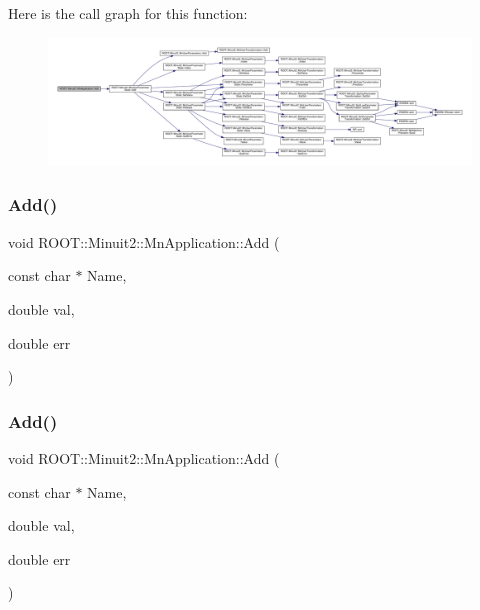 Here is the call graph for this function\+:
\nopagebreak
\begin{figure}[H]
\begin{center}
\leavevmode
\includegraphics[width=350pt]{df/dd5/classROOT_1_1Minuit2_1_1MnApplication_a2912c94b7cb69b29862e1e41ffbc4542_cgraph}
\end{center}
\end{figure}
\mbox{\label{classROOT_1_1Minuit2_1_1MnApplication_a2912c94b7cb69b29862e1e41ffbc4542}} 
\subsubsection{\texorpdfstring{Add()}{Add()}\hspace{0.1cm}{\footnotesize\ttfamily [2/9]}}
{\footnotesize\ttfamily void R\+O\+O\+T\+::\+Minuit2\+::\+Mn\+Application\+::\+Add (\begin{DoxyParamCaption}\item[{const char $\ast$}]{Name,  }\item[{double}]{val,  }\item[{double}]{err }\end{DoxyParamCaption})}

\mbox{\label{classROOT_1_1Minuit2_1_1MnApplication_a2912c94b7cb69b29862e1e41ffbc4542}} 
\subsubsection{\texorpdfstring{Add()}{Add()}\hspace{0.1cm}{\footnotesize\ttfamily [3/9]}}
{\footnotesize\ttfamily void R\+O\+O\+T\+::\+Minuit2\+::\+Mn\+Application\+::\+Add (\begin{DoxyParamCaption}\item[{const char $\ast$}]{Name,  }\item[{double}]{val,  }\item[{double}]{err }\end{DoxyParamCaption})}

